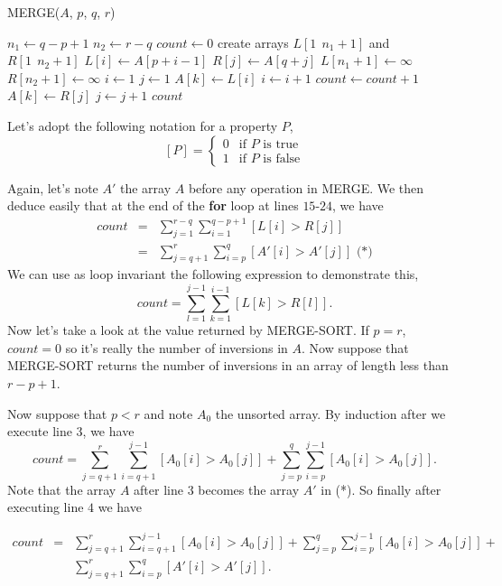 \documentclass[a4paper,12pt]{article}
\newcommand{\la}{\leftarrow}
\begin{document}
\noindent
MERGE($A$, $p$, $q$, $r$)
\begin{algorithmic}[1]
\STATE $n_1 \la q - p + 1$
\STATE $n_2 \la r - q$
\STATE $count \la 0$
\STATE create arrays $L[1\ \ n_1+1]$ and $R[1\ \ n_2+1]$
\FOR {$i \la 1$ \textbf{to} $n_1$}
	\STATE $L[i] \la A[p + i -1]$
\ENDFOR
\FOR {$j \la 1$ \textbf{to} $n_2$}
	\STATE $R[j] \la A[q + j]$
\ENDFOR
\STATE $L[n_1 + 1] \la \infty$
\STATE $R[n_2 + 1] \la \infty$
\STATE $i \la 1$
\STATE $j \la 1$
\FOR {$k \la p$ \textbf{to} $r$}
		\STATE $A[k] \la L[i]$
		\STATE $i \la i+1$
	\ELSE
		\STATE $count \la count + 1$
		\STATE $A[k] \la R[j]$
		\STATE $j \la j+1$
	\ENDIF
\ENDFOR
\RETURN $count$
\end{algorithmic}
Let's adopt the following notation for a property $P$,
\[ [P] = \left\{
\begin{array}{cl}
0 & \mbox{if $P$ is true}\\
1 & \mbox{if $P$ is false} \end{array} \right. \]

Again, let's note $A'$ the array $A$ before any operation in MERGE.
We then deduce easily that at the end of the \textbf{for} loop at
lines $15$-$24$, we have
\begin{eqnarray*}
count &=& \sum_{j=1}^{r-q}\sum_{i=1}^{q-p+1}[L[i] > R[j]]\\
&=& \sum_{j=q+1}^r \sum_{i=p}^q [A'[i] > A'[j]]\mbox{ (*)}
\end{eqnarray*}
We can use as loop invariant the following expression to demonstrate
this,
\[ count = \sum_{l=1}^{j-1} \sum_{k=1}^{i-1}[L[k] > R[l]].\]
Now let's take a look at the value returned by MERGE-SORT.  If $p =
r$, $count = 0$ so it's really the number of inversions in $A$.  Now
suppose that MERGE-SORT returns the number of inversions in an array
of length less than $r - p + 1$.

\medskip
Now suppose that $p < r$ and note $A_0$ the unsorted array.  By
induction after we execute line $3$, we have
\[ count = \sum_{j=q+1}^r\sum_{i=q+1}^{j-1}[A_0[i] > A_0[j]] +
\sum_{j=p}^q \sum_{i=p}^{j-1} [A_0[i] > A_0[j]].\]
Note that the array $A$ after line $3$ becomes the array $A'$ in (*).
So finally after executing line $4$ we have

\newpage
\begin{eqnarray*}
count &=& \sum_{j=q+1}^r\sum_{i=q+1}^{j-1}[A_0[i] > A_0[j]] +
\sum_{j=p}^q \sum_{i=p}^{j-1} [A_0[i] > A_0[j]] +\\&&
\sum_{j=q+1}^r \sum_{i=p}^q [A'[i] > A'[j]].
\end{eqnarray*}
\end{document}
